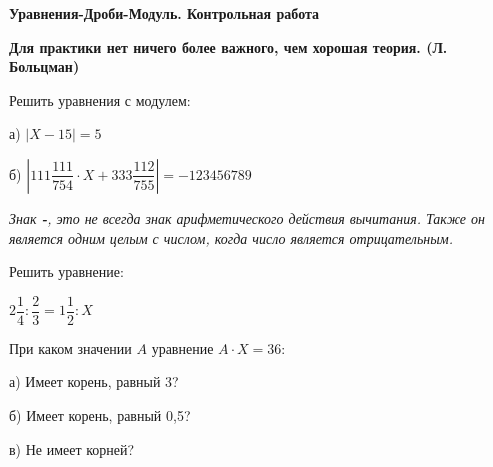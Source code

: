 \centerline{\bf \Huge Уравнения-Дроби-Модуль. Контрольная работа}
\centerline{\bf \Huge }

\begin{flushright}
        \scriptsize{\textbf{Для практики нет ничего более важного, чем хорошая теория. (Л. Больцман)}}
\end{flushright}

 Решить уравнения с модулем:

а) $|X-15|=5$

б) $|111\dfrac{111}{754}\cdot X + 333\dfrac{112}{755}|=-123456789$

\textit{Знак \textbf{-}, это не всегда знак арифметического действия вычитания. Также он является одним целым с числом, когда число является отрицательным.}

 Решить уравнение:

$2\dfrac{1}{4} : \dfrac{2}{3} = 1\dfrac{1}{2} : X$

 При каком значении $A$ уравнение $A\cdot X = 36$:

а) Имеет корень, равный 3?

б) Имеет корень, равный 0,5?

в) Не имеет корней?